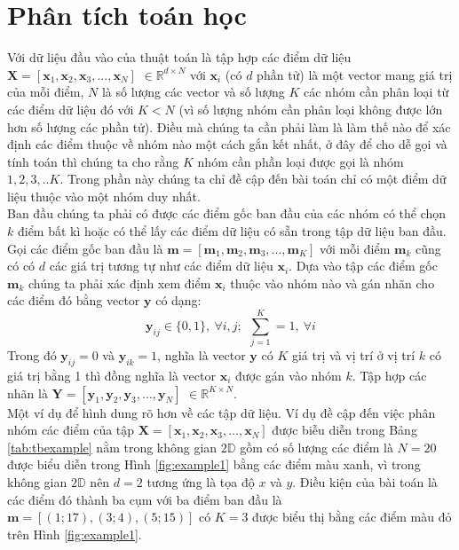 \documentclass{article}
\begin{document}
\section{Phân tích toán học} %
\label{sec:phân_tích_toán_học}
Với dữ liệu đầu vào của thuật toán là tập hợp các điểm dữ liệu $\mathbf{X} = [\mathbf{x}_1,\mathbf{x}_2,\mathbf{x}_3,...,\mathbf{x}_N]$ $\in \mathds{R}^{d\times N}$ với $\mathbf{x}_i$ (có $d$ phần tử) là một vector mang giá trị của mỗi điểm, $N$ là số lượng các vector và số lượng $K$ các nhóm cần phân loại từ các điểm dữ liệu đó với $K < N$ (vì số lượng nhóm cần phân loại không được lớn hơn số lượng các phần tử). Điều mà chúng ta cần phải làm là làm thế nào để xác định các điểm thuộc về nhóm nào một cách gắn kết nhất, ở đây để cho dễ gọi và tính toán thì chúng ta cho rằng $K$ nhóm cần phần loại được gọi là nhóm $1,2,3,..K$. Trong phần này chúng ta chỉ đề cập đến bài toán chỉ có một điểm dữ liệu thuộc vào một nhóm duy nhất.
\\
Ban đầu chúng ta phải có được các điểm gốc ban đầu của các nhóm có thể chọn $k$ điểm bất kì hoặc có thể lấy các điểm dữ liệu có sẵn trong tập dữ liệu ban đầu. Gọi các điểm gốc ban đầu là $\mathbf{m} = [\mathbf{m}_1,\mathbf{m}_2,\mathbf{m}_3,...,\mathbf{m}_K]$ với mỗi điểm $\mathbf{m}_k$ cũng có có $d$ các giá trị tương tự như các điểm dữ liệu $\mathbf{x}_i$. Dựa vào tập các điểm gốc $\mathbf{m}_k$ chúng ta phải xác định xem điểm $\mathbf{x}_i$ thuộc vào nhóm nào và gán nhãn cho các điểm đó bằng vector $\mathbf{y}$ có dạng:
$$\mathbf{y}_{ij} \in \{0,1\},\ \forall i,j;\ \  \sum_{j = 1}^{K} = 1,\  \forall i$$
Trong đó $\mathbf{y}_{ij} = 0$ và $\mathbf{y}_{ik} = 1$, nghĩa là vector $\mathbf{y}$ có $K$ giá trị và vị trí ở vị trí $k$ có giá trị bằng 1 thì đồng nghĩa là vector $\mathbf{x}_i$ được gán vào nhóm $k$. Tập hợp các nhãn là $\mathbf{Y} = [\mathbf{y}_1,\mathbf{y}_2,\mathbf{y}_3,...,\mathbf{y}_N]$ $\in \mathds{R}^{K\times N}$.
\\ 
Một ví dụ để hình dung rõ hơn về các tập dữ liệu. Ví dụ đề cập đến việc phân nhóm các điểm của tập $\mathbf{X} = [\mathbf{x}_1,\mathbf{x}_2,\mathbf{x}_3,...,\mathbf{x}_N]$ được biễu diễn trong Bảng \ref{tab:tbexample} nằm trong  không gian $2\mathds{D}$ gồm có số lượng các điểm là $N = 20$ được biểu diễn trong Hình \ref{fig:example1} bằng các điểm màu xanh, vì trong không gian $2\mathds{D}$ nên $d = 2$ tương ứng là tọa độ $x$ và $y$. Điều kiện của bài toán là các điểm đó thành ba cụm với ba điểm ban đầu là $\mathbf{m} = [(1;17),(3;4),(5;15)]$ có $K = 3$ được biểu thị bằng các điểm màu đỏ trên Hình \ref{fig:example1}.
\end{document}

